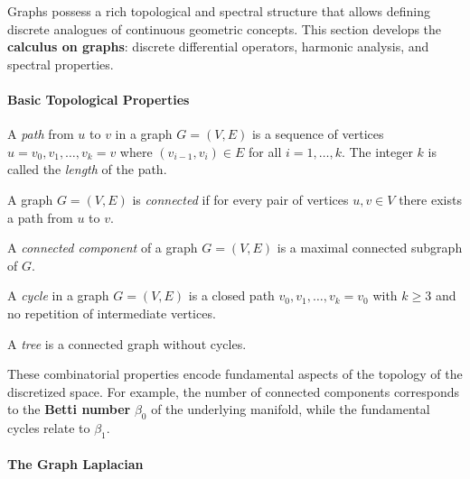Graphs possess a rich topological and spectral structure that allows defining discrete analogues of continuous geometric concepts. This section develops the \textbf{calculus on graphs}: discrete differential operators, harmonic analysis, and spectral properties.

\paragraph{Basic Topological Properties}

\begin{definition}\label{def:camino_grafo}
	A \textit{path} from $u$ to $v$ in a graph $G = (V,E)$ is a sequence of vertices $u = v_0, v_1, \ldots, v_k = v$ where $(v_{i-1}, v_i) \in E$ for all $i = 1, \ldots, k$. The integer $k$ is called the \textit{length} of the path.
\end{definition}

\begin{definition}\label{def:grafo_conexo}
	A graph $G = (V,E)$ is \textit{connected} if for every pair of vertices $u, v \in V$ there exists a path from $u$ to $v$.
\end{definition}

\begin{definition}\label{def:componente_conexa}
	A \textit{connected component} of a graph $G = (V,E)$ is a maximal connected subgraph of $G$.
\end{definition}

\begin{definition}[Cycle]\label{def:ciclo_grafo}
	A \textit{cycle} in a graph $G = (V,E)$ is a closed path $v_0, v_1, \ldots, v_k = v_0$ with $k \geq 3$ and no repetition of intermediate vertices.
\end{definition}

\begin{definition}[Tree]\label{def:arbol_grafo}
	A \textit{tree} is a connected graph without cycles.
\end{definition}

These combinatorial properties encode fundamental aspects of the topology of the discretized space. For example, the number of connected components corresponds to the \textbf{Betti number} $\beta_0$ of the underlying manifold, while the fundamental cycles relate to $\beta_1$.

\paragraph{The Graph Laplacian}


